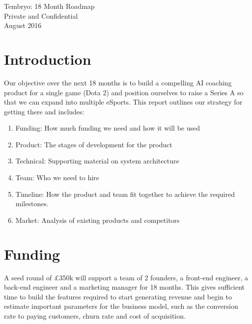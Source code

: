 \documentclass[12pt]{report} %
\begin{document}
\begin{titlepage}


    \centering
    \vspace{5cm}
  {\huge Tembryo: 18 Month Roadmap}\\
  \vspace{2.5cm}
	 \vspace{2.5cm}
	 {\Large Private and Confidential}\\
	 {\Large August 2016}
	 \vfill
\end{titlepage}


\newpage



\restoregeometry

\newpage

\tableofcontents{}
\newpage
 
\setlength{\parindent}{0pt}

\section{Introduction}

Our objective over the next 18 months is to build a compelling AI coaching product for a single game (Dota 2) and position ourselves to raise a Series A so that we can expand into multiple eSports. This report outlines our strategy for getting there and includes:
\begin{enumerate}  
\item Funding: How much funding we need and how it will be used
\item Product: The stages of development for the product 
\item Technical: Supporting material on system architecture
\item Team: Who we need to hire
\item Timeline: How the product and team fit together to achieve the required milestones.
\item Market: Analysis of existing products and competitors
\end{enumerate}

\section{Funding}

A seed round of \pounds350k will support a team of 2 founders, a front-end engineer, a back-end engineer and a marketing manager for 18 months. This gives sufficient time to build the features required to start generating revenue and begin to estimate important parameters for the business model, such as the conversion rate to paying customers, churn rate and cost of acquisition.\\
\end{document}

